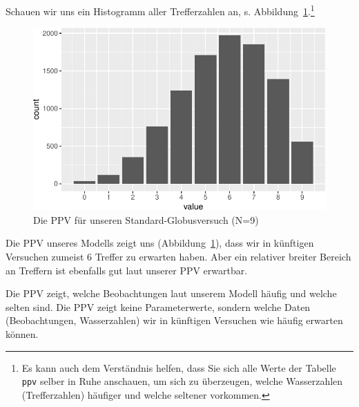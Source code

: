 \documentclass[
  a4paper,
  DIV=11]{scrreprt}
\theoremstyle{definition}
\theoremstyle{remark}
\begin{document}
Schauen wir uns ein Histogramm aller Trefferzahlen an, s.
Abbildung~\ref{fig-ppv2}.\footnote{Es kann auch dem Verständnis helfen,
  dass Sie sich alle Werte der Tabelle \texttt{ppv} selber in Ruhe
  anschauen, um sich zu überzeugen, welche Wasserzahlen (Trefferzahlen)
  häufiger und welche seltener vorkommen.}

\begin{figure}

{\centering \includegraphics{./ppv_files/figure-pdf/fig-ppv2-1.pdf}

}

\caption{\label{fig-ppv2}Die PPV für unseren Standard-Globusversuch
(N=9)}

\end{figure}

Die PPV unseres Modells zeigt uns (Abbildung~\ref{fig-ppv2}), dass wir
in künftigen Versuchen zumeist 6 Treffer zu erwarten haben. Aber ein
relativer breiter Bereich an Treffern ist ebenfalls gut laut unserer PPV
erwartbar.

\begin{tcolorbox}[enhanced jigsaw, leftrule=.75mm, left=2mm, bottomrule=.15mm, opacityback=0, coltitle=black, colbacktitle=quarto-callout-important-color!10!white, opacitybacktitle=0.6, rightrule=.15mm, toptitle=1mm, colback=white, colframe=quarto-callout-important-color-frame, arc=.35mm, toprule=.15mm, breakable, titlerule=0mm, bottomtitle=1mm, title=\textcolor{quarto-callout-important-color}{\faExclamation}\hspace{0.5em}{Wichtig}]
Die PPV zeigt, welche Beobachtungen laut unserem Modell häufig und
welche selten sind. Die PPV zeigt keine Parameterwerte, sondern welche
Daten (Beobachtungen, Wasserzahlen) wir in künftigen Versuchen wie
häufig erwarten können.
\end{tcolorbox}
\end{document}
